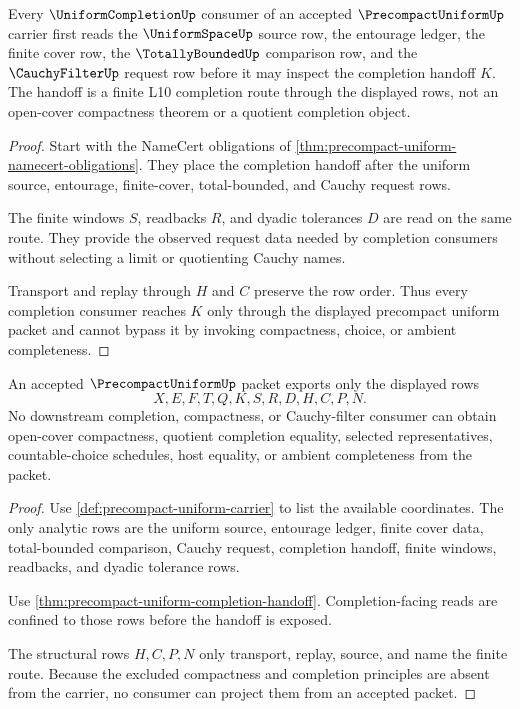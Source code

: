 \begin{theorem}
\label{thm:precompact-uniform-completion-handoff}
Every $\UniformCompletionUp$ consumer of an accepted $\PrecompactUniformUp$ carrier first reads the $\UniformSpaceUp$ source row, the entourage ledger, the finite cover row, the $\TotallyBoundedUp$ comparison row, and the $\CauchyFilterUp$ request row before it may inspect the completion handoff $K$. The handoff is a finite L10 completion route through the displayed rows, not an open-cover compactness theorem or a quotient completion object.
\end{theorem}
\begin{proof}
Start with the NameCert obligations of \autoref{thm:precompact-uniform-namecert-obligations}. They place the completion handoff after the uniform source, entourage, finite-cover, total-bounded, and Cauchy request rows.

The finite windows $S$, readbacks $R$, and dyadic tolerances $D$ are read on the same route. They provide the observed request data needed by completion consumers without selecting a limit or quotienting Cauchy names.

Transport and replay through $H$ and $C$ preserve the row order. Thus every completion consumer reaches $K$ only through the displayed precompact uniform packet and cannot bypass it by invoking compactness, choice, or ambient completeness.
\end{proof}

\begin{theorem}
\label{thm:precompact-uniform-nonescape}
An accepted $\PrecompactUniformUp$ packet exports only the displayed rows
$$
X,E,F,T,Q,K,S,R,D,H,C,P,N .
$$
No downstream completion, compactness, or Cauchy-filter consumer can obtain open-cover compactness, quotient completion equality, selected representatives, countable-choice schedules, host equality, or ambient completeness from the packet.
\end{theorem}
\begin{proof}
Use \autoref{def:precompact-uniform-carrier} to list the available coordinates. The only analytic rows are the uniform source, entourage ledger, finite cover data, total-bounded comparison, Cauchy request, completion handoff, finite windows, readbacks, and dyadic tolerance rows.

Use \autoref{thm:precompact-uniform-completion-handoff}. Completion-facing reads are confined to those rows before the handoff is exposed.

The structural rows $H,C,P,N$ only transport, replay, source, and name the finite route. Because the excluded compactness and completion principles are absent from the carrier, no consumer can project them from an accepted packet.
\end{proof}

